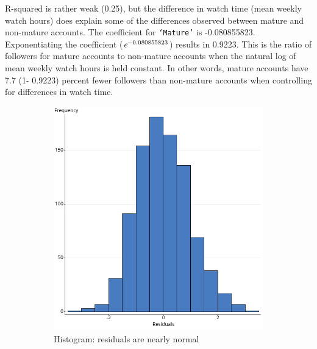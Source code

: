 \documentclass[12pt]{article}
\begin{document}
R-squared is rather weak (0.25), but the difference in watch time (mean weekly watch hours) does explain some of the differences observed between mature and non-mature accounts. The coefficient for \texttt{`Mature'} is -0.080855823. Exponentiating the coefficient ($\emph{e}^{-0.080855823}$) results in 0.9223. This is the ratio of followers for mature accounts to non-mature accounts when the natural log of mean weekly watch hours is held constant. In other words, mature accounts have 7.7 (1- 0.9223) percent fewer followers than non-mature accounts when controlling for differences in watch time.

\begin{figure}
    \centering
    \begin{subfigure}{0.45\textwidth}
        \centering
        \includegraphics[width=\textwidth]{../StatCrunch_Results/followers_mature_watch_hrs/residual_histogram}
        \caption{Histogram: residuals are nearly normal}
        \label{fig:plot1}
    \end{subfigure}
    \hfill
    \begin{subfigure}{0.45\textwidth}
        \centering

\end{subfigure}
\end{figure}
\end{document}
